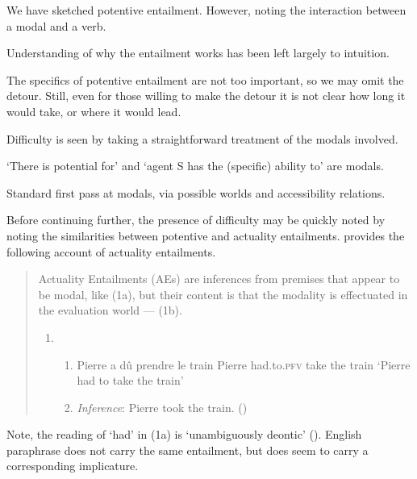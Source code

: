 \begin{note}
  We have sketched potentive entailment.
  However, noting the interaction between a modal and a verb.

  Understanding of why the entailment works has been left largely to intuition.

  The specifics of potentive entailment are not too important, so we may omit the detour.
  Still, even for those willing to make the detour it is not clear how long it would take, or where it would lead.

  Difficulty is seen by taking a straightforward treatment of the modals involved.

  `There is potential for' and `agent S has the (specific) ability to' are modals.

  Standard first pass at modals, via possible worlds and accessibility relations.

  Before continuing further, the presence of difficulty may be quickly noted by noting the similarities between potentive and actuality entailments.
  \textcite{Alxatib:2019wf} provides the following account of actuality entailments.
  \begin{quote}
    Actuality Entailments (AEs) are inferences from premises that appear to be modal, like (1a), but their content is that the modality is effectuated in the evaluation world --- (1b).

    \begin{enumerate}[label=(\arabic*)]
    \item
      \begin{enumerate}[label=\alph*.]
      \item Pierre a dû \hspace{26pt} prendre le \hspace{3.5pt} train \newline
        Pierre had.to.\textsc{pfv} take \hspace{14pt} the train\newline
        \hspace{-4pt} ‘Pierre had to take the train'
      \item \emph{Inference}: Pierre took the train.\nolinebreak
    \mbox{}\hfill\mbox{(\citeyear[701]{Alxatib:2019wf})}
      \end{enumerate}
    \end{enumerate}
  \end{quote}

  Note, the reading of `had' in (1a) is `unambiguously deontic' (\citeyear[703]{Alxatib:2019wf}).
  English paraphrase does not carry the same entailment, but does seem to carry a corresponding implicature.


\end{note}
